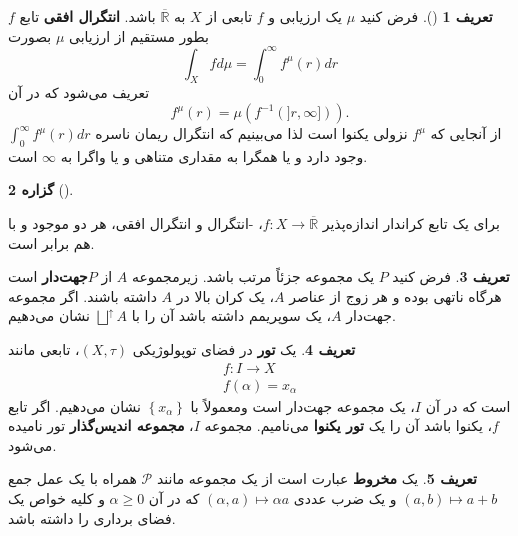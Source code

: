 \documentclass[12pt,a4paper]{article}
\theoremstyle{definition}
\newtheorem{definition}{تعریف}[section]
\theoremstyle{theorem}
\newtheorem{proposition}[definition]{گزاره}
\theoremstyle{definition}
\newcommand{\bR}{\mathbb{R}}
\begin{document}
\begin{definition}[\cite{lawson 2}]
فرض کنید $ \mu $ یک ارزیابی و $  f$ تابعی از $ X $ به 
$\overline{\bR}  $
باشد.  \textbf{انتگرال افقی} 
تابع $ f $ بطور مستقیم  از ارزیابی $ \mu $ بصورت 
$$\int_{X}fd\mu=\int_{0}^{\infty}f^{\mu}(r)dr$$
تعریف می‌شود که در آن 
$$f^{\mu}(r)=\mu\left( f^{-1}\left(]r,\infty]\right) \right). $$
از آنجایی که $  f^{\mu}$ نزولی یکنوا است لذا می‌بینیم که انتگرال ریمان ناسره $ \int_{0}^{\infty}f^{\mu}(r)dr $ وجود دارد و یا همگرا به مقداری متناهی و یا واگرا به $ \infty $ است.
\end{definition}
\begin{proposition}[\cite{lawson 2}]\label{p1} 

برای یک تابع کراندار اندازه‌پذیر   
$f:X\rightarrow \overline{\bR}$، -انتگرال و انتگرال افقی، هر دو موجود و با هم برابر است.
\end{proposition}
\begin{definition}
فرض کنید
$ P $
یک مجموعه جزئاً مرتب باشد.   زیرمجموعه
$ A $
از
\mbox{$ P $\textbf{جهت‌دار}}
است هرگاه ناتهی بوده و هر زوج از عناصر
$ A $، یک کران بالا در 
$ A $
داشته باشند.   اگر  مجموعه جهت‌دار 
$ A $، یک سوپریمم داشته باشد آن را با 
$ \bigsqcup^{\uparrow}A $
نشان می‌دهیم.
\end{definition}
\begin{definition}
یک 
\textbf{تور}
در فضای توپولوژیکی $ (X,\tau) $،  تابعی مانند 
\begin{align}
f:I\rightarrow X\nonumber \\
f(\alpha)=x_{\alpha}\nonumber
\end{align}
است که در آن $ I $،  یک مجموعه جهت‌دار است ومعمولاً با
 $ \left\lbrace x_{\alpha}\right\rbrace  $
  نشان می‌دهیم.  اگر تابع $ f $، یکنوا باشد آن را 
یک \textbf{تور یکنوا} 
می‌نامیم. مجموعه 
$ I $،   
\textbf{مجموعه اندیس‌گذار}
تور نامیده می‌شود.
\end{definition}
\begin{definition}
یک \textbf{مخروط}
  عبارت است از یک مجموعه مانند $  \mathcal{P}$ همراه با یک عمل جمع 
$ (a,b)\mapsto a+b $
 و یک ضرب عددی 
  $(\alpha , a)\mapsto \alpha a  $
 که در آن
  $ \alpha\geq 0 $
   و  کلیه خواص یک فضای برداری را داشته باشد.
\end{definition}
\end{document}
